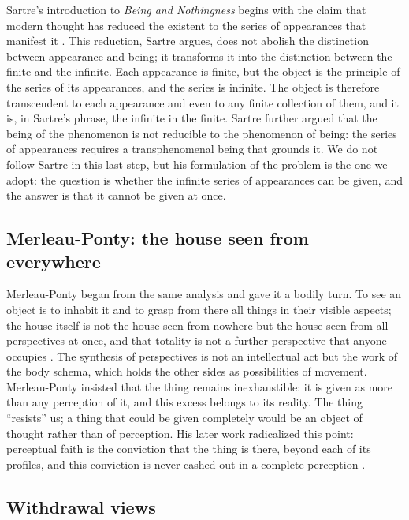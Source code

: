 \documentclass{situationist-preprint}
\begin{document}
Sartre's introduction to \emph{Being and Nothingness} begins with the claim that modern thought has reduced the existent to the series of appearances that manifest it \citep{Sartre1943}. This reduction, Sartre argues, does not abolish the distinction between appearance and being; it transforms it into the distinction between the finite and the infinite. Each appearance is finite, but the object is the principle of the series of its appearances, and the series is infinite. The object is therefore transcendent to each appearance and even to any finite collection of them, and it is, in Sartre's phrase, the infinite in the finite. Sartre further argued that the being of the phenomenon is not reducible to the phenomenon of being: the series of appearances requires a transphenomenal being that grounds it. We do not follow Sartre in this last step, but his formulation of the problem is the one we adopt: the question is whether the infinite series of appearances can be given, and the answer is that it cannot be given at once.

\subsection{Merleau-Ponty: the house seen from everywhere}

Merleau-Ponty began from the same analysis and gave it a bodily turn. To see an object is to inhabit it and to grasp from there all things in their visible aspects; the house itself is not the house seen from nowhere but the house seen from all perspectives at once, and that totality is not a further perspective that anyone occupies \citep[Part One, Introduction]{MerleauPonty1945}. The synthesis of perspectives is not an intellectual act but the work of the body schema, which holds the other sides as possibilities of movement. Merleau-Ponty insisted that the thing remains inexhaustible: it is given as more than any perception of it, and this excess belongs to its reality. The thing \enquote{resists} us; a thing that could be given completely would be an object of thought rather than of perception. His later work radicalized this point: perceptual faith is the conviction that the thing is there, beyond each of its profiles, and this conviction is never cashed out in a complete perception \citep{MerleauPonty1964}.

\subsection{Withdrawal views}
\end{document}
